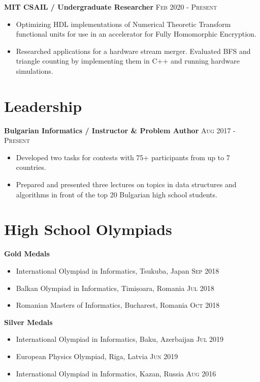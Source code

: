 \documentclass[letterpaper,11pt]{article}
\begin{document}
\textbf{MIT CSAIL / Undergraduate Researcher}
\hfill
\textsc{Feb 2020 - Present}
\begin{itemize}
    \item Optimizing HDL implementations of Numerical Theoretic Transform
        functional units for use in an accelerator for Fully Homomorphic
        Encryption.
    \item Researched applications for a hardware stream merger. Evaluated BFS
        and triangle counting by implementing them in C++ and running hardware
        simulations.
\end{itemize}

\section*{Leadership}
\textbf{Bulgarian Informatics / Instructor \& Problem Author}
\hfill
\textsc{Aug 2017 - Present}
\begin{itemize}
    \item Developed two tasks for contests with 75+ participants from up to 7
        countries.
    \item Prepared and presented three lectures on topics in data structures and
        algorithms in front of the top 20 Bulgarian high school students.
\end{itemize}

\section*{High School Olympiads}
\textbf{Gold Medals}
\begin{itemize}
    \item International Olympiad in Informatics, Tsukuba, Japan
        \hfill \textsc{Sep 2018}
    \item Balkan Olympiad in Informatics, Timișoara, Romania
        \hfill \textsc{Jul 2018}
    \item Romanian Masters of Informatics, Bucharest, Romania
        \hfill \textsc{Oct 2018}
\end{itemize}

\textbf{Silver Medals}
\begin{itemize}
    \item International Olympiad in Informatics, Baku, Azerbaijan
        \hfill \textsc{Jul 2019}
    \item European Physics Olympiad, Riga, Latvia
        \hfill \textsc{Jun 2019}
    \item International Olympiad in Informatics, Kazan, Russia
        \hfill \textsc{Aug 2016}
\end{itemize}
\end{document}
